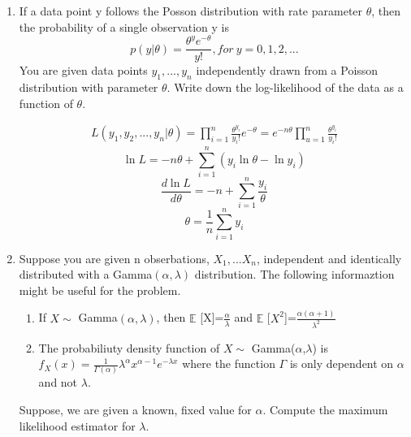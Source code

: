 \documentclass[a4paper]{article}
\begin{document}
\begin{enumerate}
\begin{solution}
		\end{solution}
		\item
		If a data point y follows the Posson distribution with rate parameter $\theta$, then the probability of a single observation y is 
		\begin{equation*}
			p(y|\theta)=\frac{\theta^ye^{-\theta}}{y!}, for \  y = 0,1,2,...
		\end{equation*}
		You are given data points $y_1,...,y_n$ independently drawn from a Poisson distribution with parameter $\theta$. Write down the log-likelihood of the data as a function of $\theta$.
		\begin{solution}
			\begin{equation*}
			\begin{aligned}
				L(y_1,y_2,...,y_n|\theta) = \prod_{i = 1}^{n} \frac{\theta^{y_i}}{y_i !}e^{-\theta}=e^{-n\theta}\prod_{u=1}^{n}\frac{\theta^{y_i}}{y_i !}
			\end{aligned}
			\end{equation*}
			\begin{equation*}
				\ln L = -n \theta + \sum_{i = 1}^{n}(y_i\ln \theta - \ln y_i)
			\end{equation*}
			\begin{equation*}
				\frac{d \ln L}{d \theta} = -n + \sum_{i = 1}^{n}\frac{y_i}{\theta}
			\end{equation*}
			\begin{equation*}
				\theta = \frac{1}{n}\sum_{i = 1}^{n}y_i
			\end{equation*}
		\end{solution}
		\item
		Suppose you are given n obserbations, $X_1,...X_n$, independent and identically distributed with a Gamma$(\alpha,\lambda)$ distribution. The following informaztion might be useful for the problem.
		\begin{enumerate}
			\item
			If $X \sim $ Gamma$(\alpha,\lambda)$, then $\mathbb{E}$ [X]=$\frac{\alpha}{\lambda}	$ and $\mathbb{E}$ [$X^2$]=$\frac{\alpha(\alpha + 1)}{\lambda^2}$
			\item
			The probabiliuty density function of $X \sim$ Gamma($\alpha$,$\lambda$) is $f_X(x)=\frac{1}{\Gamma(\alpha)}\lambda^\alpha x^{\alpha - 1}e^{-\lambda x}$ where the function $\Gamma$ is only dependent on $\alpha$ and not $\lambda$.
		\end{enumerate}
		Suppose, we are given a known, fixed value for $\alpha$. Compute the maximum likelihood estimator for $\lambda$.

\end{enumerate}
\end{document}
